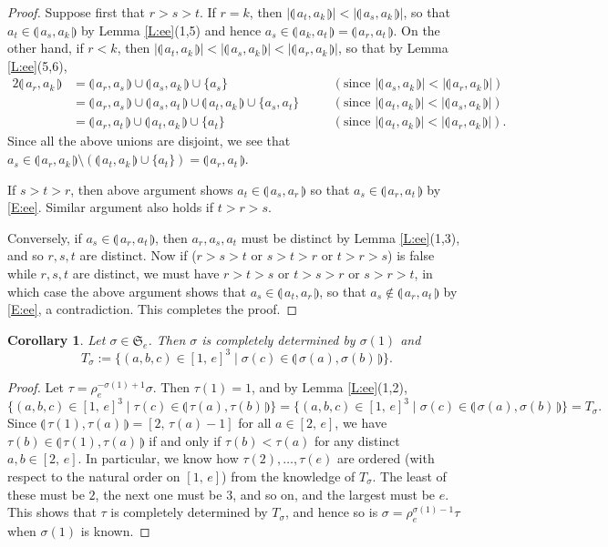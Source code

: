 \documentclass[11pt,a4paper,reqno]{amsart}
\numberwithin{equation}{section}
\theoremstyle{plain}
\newtheorem{cor}[thm]{Corollary}
\theoremstyle{definition}
\theoremstyle{remark}
\numberwithin{equation}{section}
\newcommand{\rr}{\rho}
\newcommand{\sym}[1]{\mathfrak{S}_{#1}}
\newcommand{\ft}[2]{\llparenthesis\, #1,#2 \,\rrparenthesis}
\begin{document}
\begin{proof}
Suppose first that $r > s > t$.  If $r = k$, then $|\ft{a_t}{a_k}| < |\ft{a_s}{a_k}|$, so that $a_t \in \ft{a_s}{a_k}$ by Lemma \ref{L:ee}(1,5) and hence $a_s \in \ft{a_k}{a_t} = \ft{a_r}{a_t}$.
On the other hand, if $r < k$, then
$|\ft{a_t}{a_k}| < |\ft{a_s}{a_k}| < |\ft{a_r}{a_k}|$, so that by Lemma \ref{L:ee}(5,6),
\begin{alignat*}{2}
  \ft{a_r}{a_k}
  &= \ft{a_r}{a_s} \cup \ft{a_s}{a_k} \cup \{a_s\} & \quad & (\text{since }|\ft{a_s}{a_k}| < |\ft{a_r}{a_k}|) \\
  &= \ft{a_r}{a_s} \cup \ft{a_s}{a_t} \cup \ft{a_t}{a_k} \cup \{ a_s,a_t\} & \quad & (\text{since }|\ft{a_t}{a_k}| < |\ft{a_s}{a_k}|)\\
  &= \ft{a_r}{a_t} \cup \ft{a_t}{a_k} \cup \{a_t\} & \quad & (\text{since }|\ft{a_t}{a_k}| < |\ft{a_r}{a_k}|).
\end{alignat*}
Since all the above unions are disjoint, we see that $a_s \in \ft{a_r}{a_k} \setminus (\ft{a_t}{a_k} \cup \{ a_t\}) = \ft{a_r}{a_t}$.

If $s > t > r$, then above argument shows $a_t \in \ft{a_s}{a_r}$ so that $a_s \in \ft{a_r}{a_t}$ by \eqref{E:ee}.  Similar argument also holds if $t > r > s$.

Conversely, if $a_s \in \ft{a_r}{a_t}$, then $a_r, a_s, a_t$ must be distinct by Lemma \ref{L:ee}(1,3), and so $r,s,t$ are distinct.
Now if ($r > s > t$ or $s > t > r$ or $t > r > s$) is false while $r,s,t$ are distinct, we must have $r > t > s$ or $t > s > r$ or $s > r > t$, in which case the above argument shows that $a_s \in \ft{a_t}{a_r}$, so that $a_s \notin \ft{a_r}{a_t}$ by \eqref{E:ee}, a contradiction.
This completes the proof.
\end{proof}


\begin{cor} \label{C:ee} 
Let $\sigma \in \sym{e}$.
Then $\sigma$ is completely determined by $\sigma(1)$ and
$$
T_{\sigma} := \{(a,b,c) \in [1,\,e]^3 \mid \sigma(c) \in \ft{\sigma(a)}{\sigma(b)}\}.
$$
\end{cor}

\begin{proof} 
Let $\tau = \rr_e^{-\sigma(1)+1} \sigma$.  Then $\tau(1) = 1$, and by Lemma \ref{L:ee}(1,2),
$$
\{ (a,b,c) \in [1,\,e]^3 \mid \tau(c) \in \ft{\tau(a)}{\tau(b)} \}
= \{ (a,b,c) \in [1,\,e]^3 \mid \sigma(c) \in \ft{\sigma(a)}{\sigma(b)} \} = T_{\sigma}.
$$
Since $\ft{\tau(1)}{\tau(a)} = [2,\, \tau(a)-1]$ for all $a \in [2,\, e]$, we have $\tau(b) \in \ft{\tau(1)}{\tau(a)}$ if and only if $\tau(b) < \tau(a)$ for any distinct $a, b \in [2,\,e]$.
In particular, we know how $\tau(2), \dotsc, \tau(e)$ are ordered (with respect to the natural order on $[1,\,e]$) from the knowledge of $T_{\sigma}$.
The least of these must be $2$, the next one must be $3$, and so on, and the largest must be $e$.
This shows that $\tau$ is completely determined by $T_{\sigma}$, and hence so is $\sigma = \rr_e^{\sigma(1)-1} \tau$ when $\sigma(1)$ is known.
\end{proof}
\end{document}
